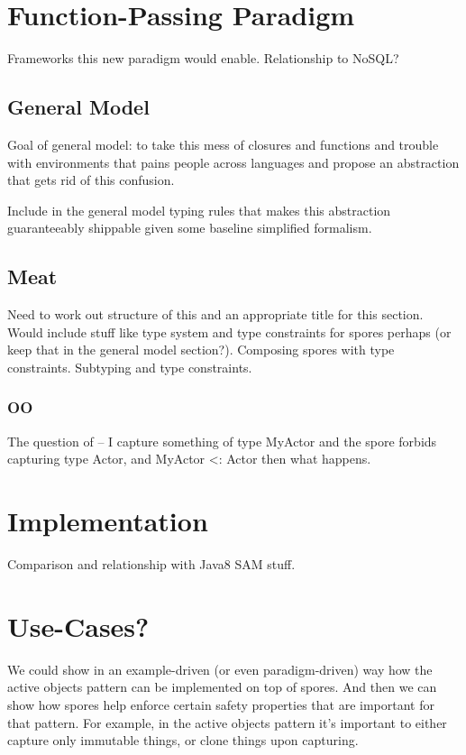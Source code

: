 \documentclass{llncs}
\begin{document}
\section{Function-Passing Paradigm}

Frameworks this new paradigm would enable. Relationship to NoSQL?

\subsection{General Model}

Goal of general model: to take this mess of closures and functions and trouble with environments that pains people across languages and propose an abstraction that gets rid of this confusion.

Include in the general model typing rules that makes this abstraction guaranteeably shippable
given some baseline simplified formalism.

\subsection{Meat}

Need to work out structure of this and an appropriate title for this section. Would include stuff like type system and type constraints for spores perhaps (or keep that in the general model section?). Composing spores with type constraints. Subtyping and type constraints.

\subsubsection{OO}

The question of -- I capture something of type MyActor
and the spore forbids capturing type Actor, and MyActor <: Actor
then what happens.

\section{Implementation}

Comparison and relationship with Java8 SAM stuff.

\section{Use-Cases?}

We could show in an example-driven (or even paradigm-driven) way how the
active objects pattern can be implemented on top of spores. And then we can
show how spores help enforce certain safety properties that are important for
that pattern. For example, in the active objects pattern it's important to
either capture only immutable things, or clone things upon capturing.
\end{document}

